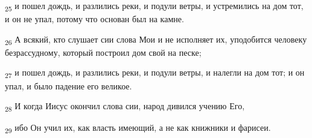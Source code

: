 \begin{tcolorbox}
\textsubscript{25} и пошел дождь, и разлились реки, и подули ветры, и устремились на дом тот, и он не упал, потому что основан был на камне.
\end{tcolorbox}
\begin{tcolorbox}
\textsubscript{26} А всякий, кто слушает сии слова Мои и не исполняет их, уподобится человеку безрассудному, который построил дом свой на песке;
\end{tcolorbox}
\begin{tcolorbox}
\textsubscript{27} и пошел дождь, и разлились реки, и подули ветры, и налегли на дом тот; и он упал, и было падение его великое.
\end{tcolorbox}
\begin{tcolorbox}
\textsubscript{28} И когда Иисус окончил слова сии, народ дивился учению Его,
\end{tcolorbox}
\begin{tcolorbox}
\textsubscript{29} ибо Он учил их, как власть имеющий, а не как книжники и фарисеи.
\end{tcolorbox}
